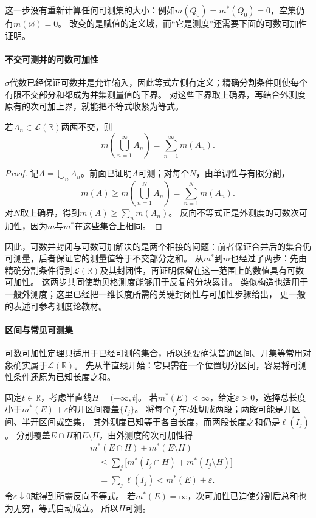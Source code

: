 这一步没有重新计算任何可测集的大小：例如$m(Q_0)=m^*(Q_0)=0$，空集仍有$m(\varnothing)=0$。
改变的是赋值的定义域，而“它是测度”还需要下面的可数可加性证明。

\paragraph{不交可测并的可数可加性}

$\sigma$代数已经保证可数并是允许输入，因此等式左侧有定义；精确分割条件则使每个有限不交部分和都成为并集测量值的下界。
对这些下界取上确界，再结合外测度原有的次可加上界，就能把不等式收紧为等式。
\begin{theorem}[勒贝格测度的可数可加性]
\label{thm:analysis-lebesgue-countable-additivity}
若$A_n\in\mathcal L(\mathbb R)$两两不交，则
\[
 m\left(\bigcup_{n=1}^{\infty}A_n\right)=\sum_{n=1}^{\infty}m(A_n).
\]
\end{theorem}
\begin{proof}
记$A=\bigcup_n A_n$。前面已证明$A$可测；对每个$N$，由单调性与有限分割，
\[
 m(A)\geq m\left(\bigcup_{n=1}^NA_n\right)=\sum_{n=1}^Nm(A_n).
\]
对$N$取上确界，得到$m(A)\geq\sum_n m(A_n)$。
反向不等式正是外测度的可数次可加性，因为$m$与$m^*$在这些集合上相同。
\end{proof}

因此，可数并封闭与可数可加解决的是两个相接的问题：前者保证合并后的集合仍可测量，后者保证它的测量值等于不交部分之和。
从$m^*$到$m$也经过了两步：先由精确分割条件得到$\mathcal L(\mathbb R)$及其封闭性，再证明保留在这一范围上的数值具有可数可加性。
这两步共同使勒贝格测度能够用于反复的分块累计。
类似构造也适用于一般外测度；这里已经把一维长度所需的关键封闭性与可加性步骤给出，
更一般的表述可参考测度论教材。

\paragraph{区间与常见可测集}

可数可加性定理只适用于已经可测的集合，所以还要确认普通区间、开集等常用对象确实属于$\mathcal L(\mathbb R)$。
先从半直线开始：它只需在一个位置切分区间，容易将可测性条件还原为已知长度之和。

固定$t\in\mathbb R$，考虑半直线$H=(-\infty,t]$。
若$m^*(E)<\infty$，给定$\varepsilon>0$，选择总长度小于$m^*(E)+\varepsilon$的开区间覆盖$\{I_j\}$。
将每个$I_j$在$t$处切成两段；两段可能是开区间、半开区间或空集，
其外测度已知等于各自长度，而两段长度之和仍是$\ell(I_j)$。
分别覆盖$E\cap H$和$E\setminus H$，由外测度的次可加性得
\[
 \begin{aligned}
 &m^*(E\cap H)+m^*(E\setminus H)\\
 &\quad\leq\sum_j\bigl[m^*(I_j\cap H)+m^*(I_j\setminus H)\bigr]\\
 &\quad=\sum_j\ell(I_j)<m^*(E)+\varepsilon.
 \end{aligned}
\]
令$\varepsilon\downarrow0$就得到所需反向不等式。
若$m^*(E)=\infty$，次可加性已迫使分割后总和也为无穷，等式自动成立。
所以$H$可测。


